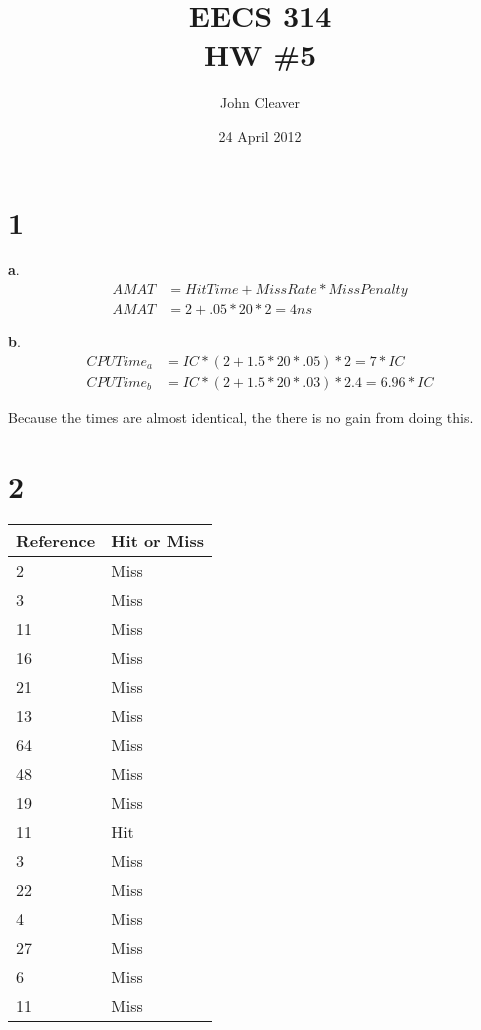 \documentclass{article}
\title{EECS 314 \\ HW \#5}
\author{John Cleaver}
\date{24 April 2012}
\begin{document}
\maketitle

\section*{1}

{\bf a}.
\begin{align*}
AMAT &= Hit Time + Miss Rate * Miss Penalty \\
AMAT &= 2 + .05 * 20 * 2 = 4 ns
\end{align*}

{\bf b}.
\begin{align*}
CPU Time_a &= IC * (2 + 1.5 * 20 * .05) * 2   = 7 * IC \\
CPU Time_b &= IC * (2 + 1.5 * 20 * .03) * 2.4 = 6.96 * IC
\end{align*}

Because the times are almost identical, the there is no gain from doing this.

\section*{2}

\begin{tabular}{|l|l|}
\hline
Reference & Hit or Miss \\ \hline
2 & Miss \\ \hline
3 & Miss \\ \hline
11 & Miss \\ \hline
16 &  Miss \\ \hline
21 &  Miss \\ \hline
13 &  Miss \\ \hline
64 &  Miss \\ \hline
48 &  Miss \\ \hline
19 &  Miss \\ \hline
11 & Hit \\ \hline
3 &  Miss \\ \hline
22 &  Miss \\ \hline
4 &  Miss \\ \hline
27 &  Miss \\ \hline
6 &  Miss \\ \hline
11 &  Miss \\ \hline
\end{tabular}
\end{document}
